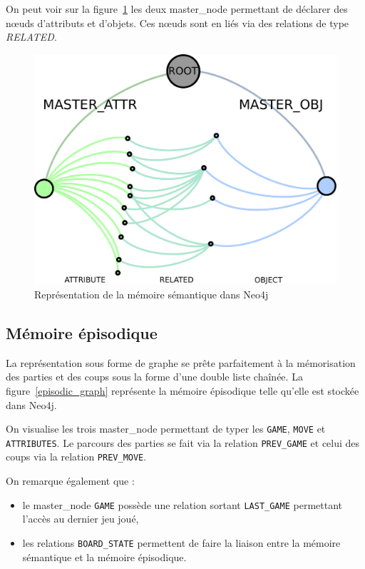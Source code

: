 On peut voir sur la figure~\ref{lattice_graph} les deux \og master\_node \fg{} permettant de déclarer des nœuds d'attributs et d'objets. Ces nœuds sont en liés via des relations de type \emph{RELATED}.

\begin{figure}[H]
\includegraphics[width=\textwidth]{files/neo4j/lattice_graph}
\caption{Représentation de la mémoire sémantique dans Neo4j}
\label{lattice_graph}
\end{figure}

\subsection{Mémoire épisodique}

La représentation sous forme de graphe se prête parfaitement à la mémorisation des parties et des coups sous la forme d'une double liste chaînée. La figure~\ref{episodic_graph} représente la mémoire épisodique telle qu'elle est stockée dans Neo4j.

On visualise les trois \og master\_node \fg{} permettant de typer les \texttt{GAME}, \texttt{MOVE} et \texttt{ATTRIBUTES}. Le parcours des parties se fait via la relation \texttt{PREV\_GAME} et celui des coups via la relation \texttt{PREV\_MOVE}.

On remarque également que :
\begin{itemize}
\item le \og master\_node \fg{} \texttt{GAME} possède une relation sortant \texttt{LAST\_GAME} permettant l'accès au dernier jeu joué,
\item les relations \texttt{BOARD\_STATE} permettent de faire la liaison entre la mémoire sémantique et la mémoire épisodique.
\end{itemize}

